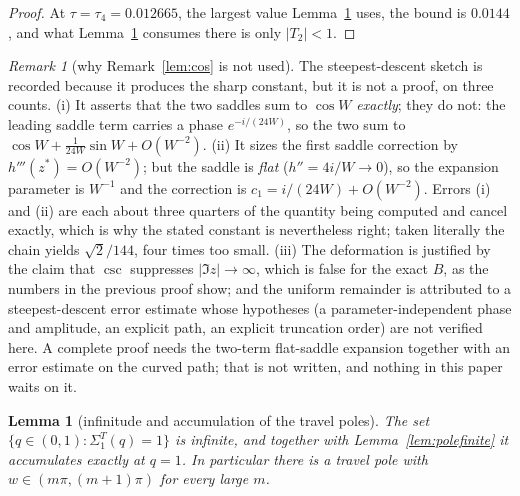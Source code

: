 \documentclass[11pt]{article}
\theoremstyle{plain}
\newtheorem{lemma}[theorem]{Lemma}
\theoremstyle{definition}
\theoremstyle{remark}
\newtheorem{remark}[theorem]{Remark}
\begin{document}
\begin{proof}
At $\tau=\tau_4=0.012665$, the largest value Lemma~\ref{lem:infpoles} uses, the bound is $0.0144$,
and what Lemma~\ref{lem:infpoles} consumes there is only $|T_2|<1$.
\end{proof}

\begin{remark}[why Remark~\ref{lem:cos} is not used]\label{rem:cosgap}
The steepest-descent sketch is recorded because it produces the sharp constant, but it is not a
proof, on three counts. (i) It asserts that the two saddles sum to $\cos W$ \emph{exactly}; they do
not: the leading saddle term carries a phase $e^{-i/(24W)}$, so the two sum to
$\cos W+\tfrac1{24W}\sin W+O(W^{-2})$. (ii) It sizes the first saddle correction by
$h'''(z^\ast)=O(W^{-2})$; but the saddle is \emph{flat} ($h''=4i/W\to0$), so the expansion parameter
is $W^{-1}$ and the correction is $c_1=i/(24W)+O(W^{-2})$. Errors (i) and (ii) are each about
three quarters of the quantity being computed and cancel exactly, which is why the stated constant
is nevertheless right; taken literally the chain yields $\sqrt2/144$, four times too small.
(iii) The deformation is justified by the claim that $\csc$ suppresses $|\Im z|\to\infty$, which is
false for the exact $B$, as the numbers in the previous proof show; and the uniform remainder is
attributed to a steepest-descent error estimate whose hypotheses (a parameter-independent phase and
amplitude, an explicit path, an explicit truncation order) are not verified here. A complete proof
needs the two-term flat-saddle expansion together with an error estimate on the curved path; that is
not written, and nothing in this paper waits on it.
\end{remark}

\begin{lemma}[infinitude and accumulation of the travel poles]\label{lem:infpoles}
The set $\{q\in(0,1):\Sigma_1^T(q)=1\}$ is infinite, and together with
Lemma~\ref{lem:polefinite} it accumulates exactly at $q=1$. In particular there is a travel pole
with $w\in(m\pi,(m+1)\pi)$ for every large $m$.
\end{lemma}
\end{document}
